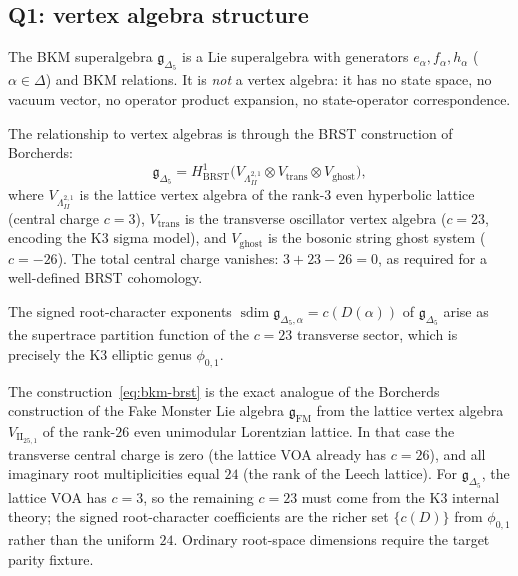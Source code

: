 \subsection{Q1: vertex algebra structure}
\label{subsec:k3e-bkm-q1}

The BKM superalgebra $\mathfrak{g}_{\Delta_5}$ is a Lie superalgebra with generators $e_\alpha, f_\alpha, h_\alpha$ ($\alpha \in \Delta$) and BKM relations. It is \emph{not} a vertex algebra: it has no state space, no vacuum vector, no operator product expansion, no state-operator correspondence.

The relationship to vertex algebras is through the BRST construction of Borcherds:
\begin{equation}
\label{eq:bkm-brst}
 \mathfrak{g}_{\Delta_5} = H^1_{\mathrm{BRST}}\bigl(V_{\Lambda^{2,1}_{II}} \otimes V_{\mathrm{trans}} \otimes V_{\mathrm{ghost}}\bigr),
\end{equation}
where $V_{\Lambda^{2,1}_{II}}$ is the lattice vertex algebra of the rank-$3$ even hyperbolic lattice (central charge $c = 3$), $V_{\mathrm{trans}}$ is the transverse oscillator vertex algebra ($c = 23$, encoding the K3 sigma model), and $V_{\mathrm{ghost}}$ is the bosonic string ghost system ($c = -26$). The total central charge vanishes: $3 + 23 - 26 = 0$, as required for a well-defined BRST cohomology.

The signed root-character exponents \(\operatorname{sdim}\mathfrak g_{\Delta_5,\alpha}=c(D(\alpha))\) of $\mathfrak{g}_{\Delta_5}$ arise as the supertrace partition function of the $c = 23$ transverse sector, which is precisely the K3 elliptic genus $\phi_{0,1}$.

\begin{remark}
\label{rem:k3e-fake-monster-comparison}
The construction~\eqref{eq:bkm-brst} is the exact analogue of the Borcherds construction of the Fake Monster Lie algebra $\mathfrak{g}_{\mathrm{FM}}$ from the lattice vertex algebra $V_{\mathrm{II}_{25,1}}$ of the rank-$26$ even unimodular Lorentzian lattice. In that case the transverse central charge is zero (the lattice VOA already has $c = 26$), and all imaginary root multiplicities equal $24$ (the rank of the Leech lattice). For $\mathfrak{g}_{\Delta_5}$, the lattice VOA has $c = 3$, so the remaining $c = 23$ must come from the K3 internal theory; the signed root-character coefficients are the richer set $\{c(D)\}$ from $\phi_{0,1}$ rather than the uniform $24$. Ordinary root-space dimensions require the target parity fixture.
\end{remark}

